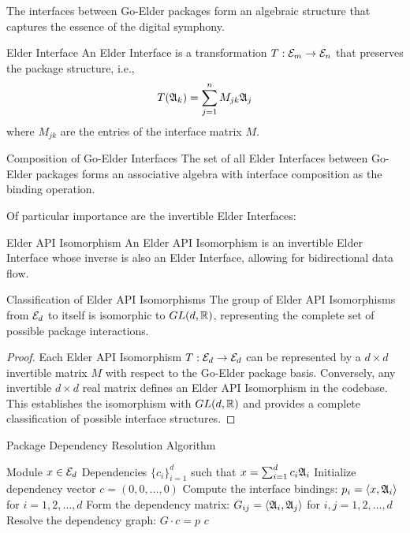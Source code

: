 \begin{twocolumnlayout}
The interfaces between Go-Elder packages form an algebraic structure that captures the essence of the digital symphony.

\begin{definition}{Elder Interface}{}
An Elder Interface is a transformation $T: \mathcal{E}_{m} \to \mathcal{E}_{n}$ that preserves the package structure, i.e.,
\begin{equation}
T(\mathfrak{A}_{k}) = \sum_{j=1}^{n} M_{jk} \mathfrak{A}_{j}
\end{equation}
where $M_{jk}$ are the entries of the interface matrix $M$.
\end{definition}

\begin{proposition}{Composition of Go-Elder Interfaces}{}
The set of all Elder Interfaces between Go-Elder packages forms an associative algebra with interface composition as the binding operation.
\end{proposition}

Of particular importance are the invertible Elder Interfaces:

\begin{definition}{Elder API Isomorphism}{}
An Elder API Isomorphism is an invertible Elder Interface whose inverse is also an Elder Interface, allowing for bidirectional data flow.
\end{definition}

\begin{theorem}{Classification of Elder API Isomorphisms}{}
The group of Elder API Isomorphisms from $\mathcal{E}_{d}$ to itself is isomorphic to $GL(d, \mathbb{R})$, representing the complete set of possible package interactions.
\end{theorem}

\begin{proof}
Each Elder API Isomorphism $T: \mathcal{E}_{d} \to \mathcal{E}_{d}$ can be represented by a $d \times d$ invertible matrix $M$ with respect to the Go-Elder package basis. Conversely, any invertible $d \times d$ real matrix defines an Elder API Isomorphism in the codebase. This establishes the isomorphism with $GL(d, \mathbb{R})$ and provides a complete classification of possible interface structures.
\end{proof}

\begin{algorithm}{Package Dependency Resolution Algorithm}
\caption{Decomposition of a Go-Elder module into package dependencies}
\begin{algorithmic}[1]
\Input Module $x \in \mathcal{E}_{d}$
\Output Dependencies $\{c_i\}_{i=1}^d$ such that $x = \sum_{i=1}^d c_i \mathfrak{A}_{i}$
\State Initialize dependency vector $c = (0, 0, \ldots, 0)$
\State Compute the interface bindings: $p_i = \langle x, \mathfrak{A}_{i} \rangle$ for $i = 1, 2, \ldots, d$
\State Form the dependency matrix: $G_{ij} = \langle \mathfrak{A}_{i}, \mathfrak{A}_{j} \rangle$ for $i, j = 1, 2, \ldots, d$
\State Resolve the dependency graph: $G \cdot c = p$
\State \Return $c$
\end{algorithmic}
\end{algorithm}

\end{twocolumnlayout}

